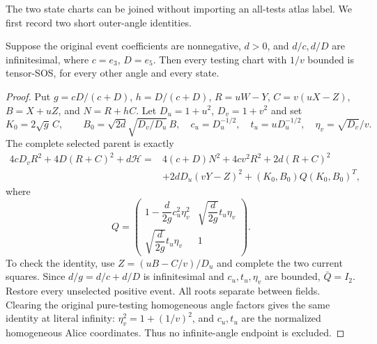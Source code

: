 \label{p6cad7544d1b8:sec:c1-uniform-all-tests}

The two state charts can be joined without importing an all-tests atlas
label. We first record two short outer-angle identities.

\begin{lemma}
Suppose the original event coefficients are nonnegative, $d>0$, and
$d/c,d/D$ are infinitesimal, where $c=e_3$, $D=e_5$.
Then every testing chart with $1/v$ bounded is tensor-SOS, for every
other angle and every state.
\end{lemma}
\begin{proof}
Put $g=cD/(c+D)$, $h=D/(c+D)$, $R=uW-Y$,
$C=v(uX-Z)$, $B=X+uZ$, and $N=R+hC$.
Let $D_u=1+u^2$, $D_v=1+v^2$ and set
\[
 K_0=2\sqrt g\,C,\qquad
 B_0=\sqrt{2d}\sqrt{D_v/D_u}\,B,\quad
 c_u=D_u^{-1/2},\quad t_u=uD_u^{-1/2},\quad
 \eta_v=\sqrt{D_v}/v.
\]
The complete selected parent is exactly
\[
\begin{split}
4cD_vR^2+4D(R+C)^2+d\mathcal H
={}&4(c+D)N^2+4cv^2R^2+2d(R+C)^2\\
 &+2dD_u(vY-Z)^2+(K_0,B_0)Q(K_0,B_0)^T,
\end{split}
\]
where
\[
 Q=\begin{pmatrix}
 1-\dfrac{d}{2g}c_u^2\eta_v^2&
 \sqrt{\dfrac{d}{2g}}t_u\eta_v\\
 \sqrt{\dfrac{d}{2g}}t_u\eta_v&1
 \end{pmatrix}.
\]
To check the identity, use $Z=(uB-C/v)/D_u$ and complete the two current
squares. Since $d/g=d/c+d/D$ is infinitesimal and $c_u,t_u,\eta_v$
are bounded, $\bar Q=I_2$. Restore every unselected positive event.
All roots separate between fields. Clearing the original pure-testing
homogeneous angle factors gives the same identity at literal infinity:
$\eta_v^2=1+(1/v)^2$, and $c_u,t_u$ are the normalized homogeneous
Alice coordinates. Thus no infinite-angle endpoint is excluded.
\end{proof}

